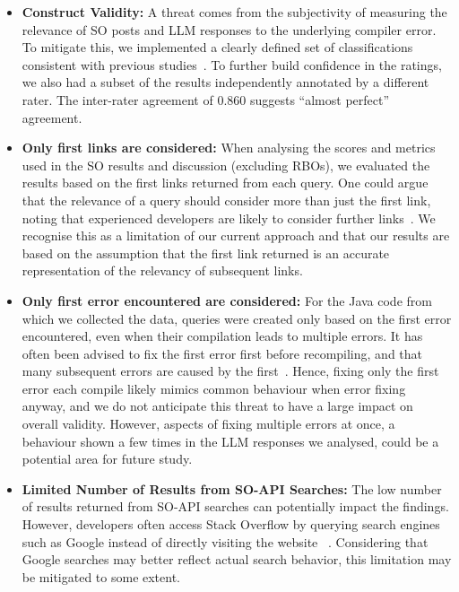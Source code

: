 \documentclass[preprint,12pt]{elsarticle}
\begin{document}
\begin{itemize}
\item\textbf{Construct Validity:} A threat comes from the subjectivity of measuring the relevance of SO posts and LLM responses to the underlying compiler error. To mitigate this, we implemented a clearly defined set of classifications consistent with previous studies~\cite{r20, o2,o20,o15}. To further build confidence in the ratings, we also had a subset of the results independently annotated by a different rater. The inter-rater agreement of 0.860 suggests ``almost perfect'' agreement. 

\item\textbf{Only first links are considered:} When analysing the scores and metrics used in the SO results and discussion (excluding RBOs), we evaluated the results based on the first links returned from each query. One could argue that the relevance of a query should consider more than just the first link, noting that experienced developers are likely to consider further links~\cite{r1}. We recognise this as a limitation of our current approach and that our results are based on the assumption that the first link returned is an accurate representation of the relevancy of subsequent links.

\item\textbf{Only first error encountered are considered:} For the Java code from which we collected the data, queries were created only based on the first error encountered, even when their compilation leads to multiple errors. It has often been advised to fix the first error first before recompiling, and that many subsequent errors are caused by the first~\cite{t25, t26}. Hence, fixing only the first error each compile likely mimics common behaviour when error fixing anyway, and we do not anticipate this threat to have a large impact on overall validity. However, aspects of fixing multiple errors at once, a behaviour shown a few times in the LLM responses we analysed, could be a potential area for future study.

\item\textbf{Limited Number of Results from SO-API Searches:} The low number of results returned from SO-API searches can potentially impact the findings. However, developers often access Stack Overflow by querying search engines such as Google instead of directly visiting the website ~\cite{r10}. Considering that Google searches may better reflect actual search behavior, this limitation may be mitigated to some extent.


\end{itemize}
\end{document}
